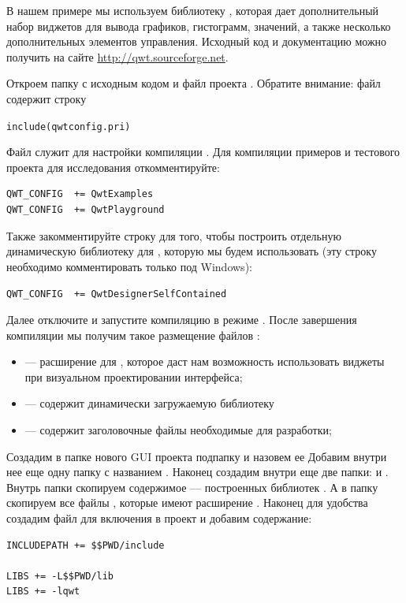 В нашем примере мы используем библиотеку , которая дает дополнительный набор виджетов для вывода графиков,
гистограмм, значений, а также несколько дополнительных элементов управления. Исходный код и документацию можно получить
на сайте \url{http://qwt.sourceforge.net}. 

Откроем папку с исходным кодом и файл проекта . Обратите внимание: файл 
содержит строку 

\lstinline!include(qwtconfig.pri)!

Файл  служит для настройки компиляции . Для компиляции примеров и тестового проекта для
исследования  откомментируйте: 
\begin{lstlisting}
QWT_CONFIG  += QwtExamples
QWT_CONFIG  += QwtPlayground
\end{lstlisting}

Также закомментируйте строку для того, чтобы построить отдельную динамическую библиотеку для , которую мы будем
использовать (эту строку необходимо комментировать только под Windows): 

\lstinline!QWT_CONFIG  += QwtDesignerSelfContained!

Далее отключите  и запустите компиляцию в режиме . После завершения компиляции мы получим такое
размещение файлов :

\begin{itemize}
\item {}--- расширение для , которое даст нам возможность
использовать виджеты  при визуальном проектировании интерфейса;
\item {} --- содержит динамически загружаемую библиотеку  
\item {} --- содержит заголовочные файлы необходимые для разработки;
\end{itemize}
Создадим в папке нового GUI проекта подпапку и назовем ее  Добавим внутри нее еще одну папку с
названием . Наконец создадим внутри  еще две папки:  и
. Внутрь папки  скопируем содержимое  --- построенных
библиотек  . А в папку  скопируем все файлы , которые
имеют расширение . Наконец для удобства создадим файл для включения в проект 
 и добавим содержание:

\begin{lstlisting}
INCLUDEPATH += $$PWD/include

LIBS += -L$$PWD/lib
LIBS += -lqwt
\end{lstlisting}

